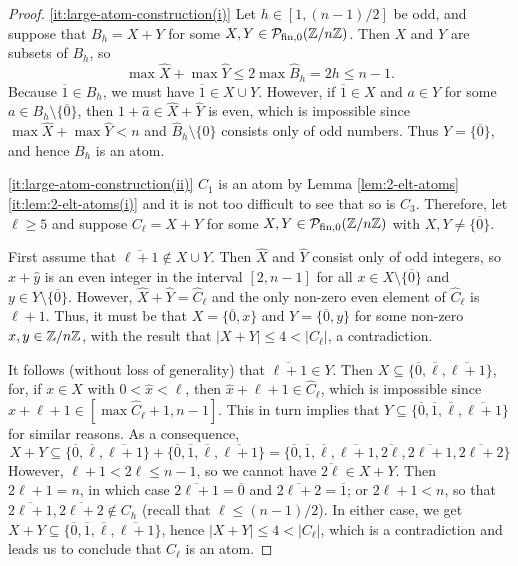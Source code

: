 \begin{proof}
\ref{it:large-atom-construction(i)} Let $h \in [ 1, (n-1)/2 ]$ be odd, and suppose that $B_h = X + Y$ for some $X,Y\in \mathcal P_{\textrm{fin},0}(\mathbb{Z}/n\mathbb{Z})$.
Then $X$ and $Y$ are subsets of $B_h$, so
\[
\max\hat{X} + \max\hat{Y} \le 2\max\hat{B}_h = 2h \le n-1.
\]
Because $\overline{1}\in B_h$, we must have $\overline{1}\in X\cup Y$.
However, if $\overline{1}\in X$ and $a\in Y$ for some $a \in B_h\setminus\{\overline{0}\}$, then  $1+\hat{a} \in \hat{X} + \hat{Y}$ is even, which is impossible since $\max\hat{X} + \max\hat{Y} < n$ and $\hat{B}_h \setminus\{0\}$ consists only of odd numbers.
Thus $Y = \{\overline{0}\}$, and hence $B_h$ is an atom.

\ref{it:large-atom-construction(ii)}
$C_1$ is an atom by Lemma \ref{lem:2-elt-atoms}\ref{it:lem:2-elt-atoms(i)} and it is not too difficult to see that so is $C_3$. Therefore, let $\ell\ge 5$ and suppose $C_\ell = X+Y$ for some $X,Y\in \mathcal P_{\textrm{fin},0}(\mathbb{Z}/n\mathbb{Z})$ with $X,Y\neq\bigl\{\overline{0}\bigr\}$.

First assume that $\overline{\ell+1}\notin X\cup Y$. Then $\hat{X}$ and $\hat{Y}$ consist only of odd integers, so $\hat{x}+\hat{y}$ is an even integer in the interval $[ 2, n-1 ]$ for all $x\in X\setminus\bigl\{\overline{0}\bigr\}$ and $y\in Y\setminus\bigl\{\overline{0}\bigr\}$.
However, $\hat{X}+\hat{Y} = \hat{C}_\ell$ and the only non-zero even element of $\hat{C}_\ell$ is $\ell+1$. Thus, it must be that $X = \bigl\{\overline{0},x\bigr\}$ and $Y = \bigl\{\overline{0},y\bigr\}$ for some non-zero $x, y \in \mathbb{Z}/n\mathbb{Z}$, with the result that $|X+Y| \le 4 < |C_\ell|$, a contradiction.

It follows (without loss of generality) that $\overline{\ell+1}\in Y$.
Then $X \subseteq \bigl\{\overline{0},\overline{\ell},\overline{\ell+1}\bigr\}$, for, if $x\in X$ with $0 < \hat{x} < \ell$, then $\hat{x} + \ell+1 \in \hat{C}_\ell$, which is impossible since $\hat{x}+\ell+1 \in [ \max\hat{C}_\ell+1 , n-1 ]$.
This in turn implies that $Y \subseteq \bigl\{\overline{0},\overline{1},\overline{\ell},\overline{\ell+1}\bigr\}$ for similar reasons. As a consequence,
\[
X+Y
\subseteq \bigl\{\overline{0},\overline{\ell},\overline{\ell+1}\bigr\}
+ \bigl\{\overline{0},\overline{1},\overline{\ell},\overline{\ell+1}\bigr\}
= \bigl\{ \overline{0}, \overline{1}, \overline{\ell}, \overline{\ell+1}, \overline{2\ell},\overline{2\ell+1}, \overline{2\ell+2} \bigr\}
\]
However, $\ell+1 < 2\ell \le n-1$, so we cannot have $\overline{2\ell}\in X+Y$. Then $2\ell+1 = n$, in which case $\overline{2\ell+1} = \overline{0}$ and $\overline{2\ell+2} = \overline{1}$; or $2\ell+1 < n$, so that $\overline{2\ell+1}, \overline{2\ell+2} \notin C_h$ (recall that $\ell \le (n-1)/2$). In either case, we get $X+Y \subseteq \bigl\{ \overline{0}, \overline{1}, \overline{\ell}, \overline{\ell+1}\bigr\}$, hence $|X+Y| \le 4 < |C_\ell|$, which is a contradiction and leads us to conclude that $C_\ell$ is an atom.
\end{proof}

